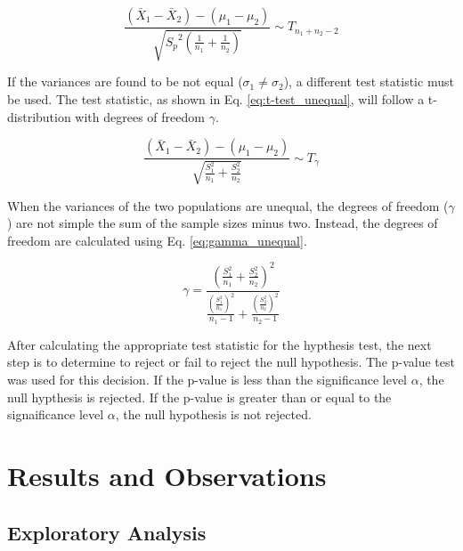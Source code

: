 \documentclass{article}
\begin{document}
\begin{equation}
	\frac{(\bar{X}_1 - \bar{X}_2) - (\mu_1 - \mu_2)}{\sqrt{{S_p}^2
	\left(\frac{1}{n_1} + \frac{1}{n_2} \right)}} \sim T_{n_1 + n_2 -2}
	\label{eq:t-test_equal}
\end{equation}

If the variances are found to be not equal ($\sigma_1 \neq \sigma_2$), a different test statistic must be used. The test statistic, as shown in Eq. \ref{eq:t-test_unequal}, will follow a t-distribution with degrees of freedom $\gamma$. 

\begin{equation}
	\frac{(\bar{X}_1 - \bar{X}_2) - (\mu_1 - \mu_2)}{\sqrt{\frac{S_1^2}{n_1} +
	\frac{S_2^2}{n_2}}} \sim T_\gamma
	\label{eq:t-test_unequal}
\end{equation}

When the variances of the two populations are unequal, the degrees of freedom ($\gamma$) are not simple the sum of the sample sizes minus two. Instead, the degrees of freedom are calculated using Eq. \ref{eq:gamma_unequal}.

\begin{equation}
	\gamma = \frac{\left(\frac{S_1^2}{n_1} + \frac{S_2^2}{n_2}
	\right)^2}{\frac{\left(\frac{S_1^2}{n_1} \right)^2}{n_1 - 1} +
	\frac{\left(\frac{S_2^2}{n_2} \right)^2}{n_2 - 1}}
	\label{eq:gamma_unequal}
\end{equation}

After calculating the appropriate test statistic for the hypthesis test, the next step is to determine to reject or fail to reject the null hypothesis. The p-value test was used for this decision. If the p-value is less than the significance level $\alpha$, the null hypthesis is rejected. If the p-value is greater than or equal to the signaificance level $\alpha$, the null hypothesis is not rejected.

\section{Results and Observations}
\subsection{Exploratory Analysis}
\end{document}
